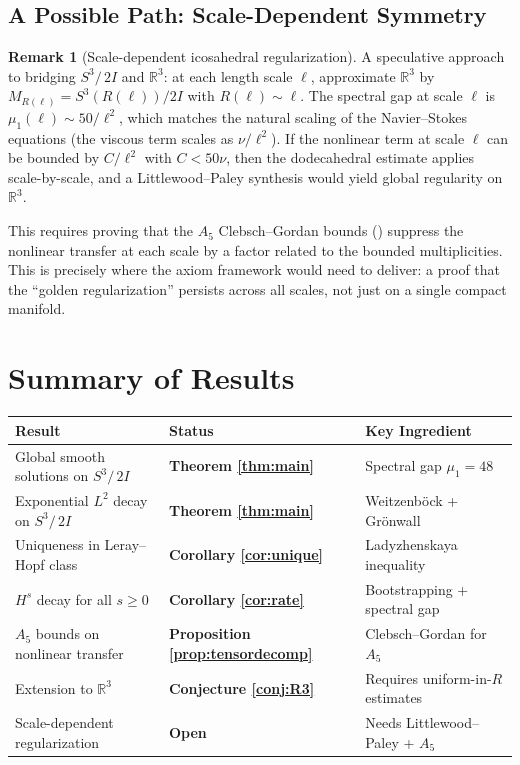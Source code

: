 \documentclass[11pt,a4paper]{article}
\theoremstyle{plain}
\theoremstyle{definition}
\newtheorem{remark}[theorem]{Remark}
\newcommand{\R}{\mathbb{R}}
\newcommand{\DS}{S^3\!/\,2I}             %
\newcommand{\BI}{2I}                      %
\begin{document}
\subsection{A Possible Path: Scale-Dependent Symmetry}

\begin{remark}[Scale-dependent icosahedral regularization]
A speculative approach to bridging $\DS$ and $\R^3$: at each length scale
$\ell$, approximate $\R^3$ by $M_{R(\ell)} = S^3(R(\ell))/\BI$ with
$R(\ell) \sim \ell$.  The spectral gap at scale $\ell$ is
$\mu_1(\ell) \sim 50/\ell^2$, which matches the natural scaling of the
Navier--Stokes equations (the viscous term scales as $\nu/\ell^2$).
If the nonlinear term at scale $\ell$ can be bounded by $C/\ell^2$ with
$C < 50\nu$, then the dodecahedral estimate applies scale-by-scale,
and a Littlewood--Paley synthesis would yield global regularity on $\R^3$.

This requires proving that the $A_5$ Clebsch--Gordan bounds
() suppress the nonlinear transfer at each scale
by a factor related to the bounded multiplicities.  This is precisely where
the axiom framework would need to deliver: a proof that the ``golden
regularization'' persists across all scales, not just on a single compact
manifold.
\end{remark}

\section{Summary of Results}\label{sec:summary}

\renewcommand{\arraystretch}{1.3}
\begin{center}
\begin{tabular}{@{}lll@{}}
\toprule
\textbf{Result} & \textbf{Status} & \textbf{Key Ingredient} \\
\midrule
Global smooth solutions on $\DS$ & \textbf{Theorem \ref{thm:main}}
  & Spectral gap $\mu_1 = 48$ \\
Exponential $L^2$ decay on $\DS$ & \textbf{Theorem \ref{thm:main}}
  & Weitzenb\"{o}ck + Gr\"{o}nwall \\
Uniqueness in Leray--Hopf class & \textbf{Corollary \ref{cor:unique}}
  & Ladyzhenskaya inequality \\
$H^s$ decay for all $s \ge 0$ & \textbf{Corollary \ref{cor:rate}}
  & Bootstrapping + spectral gap \\
$A_5$ bounds on nonlinear transfer & \textbf{Proposition \ref{prop:tensordecomp}}
  & Clebsch--Gordan for $A_5$ \\
\midrule
Extension to $\R^3$ & \textbf{Conjecture \ref{conj:R3}}
  & Requires uniform-in-$R$ estimates \\
Scale-dependent regularization & \textbf{Open}
  & Needs Littlewood--Paley + $A_5$ \\
\bottomrule
\end{tabular}
\end{center}
\end{document}
